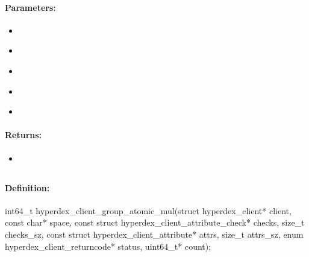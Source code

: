\paragraph{Parameters:}
\begin{itemize}[noitemsep]
\item {}\\

\item {}\\

\item {}\\

\item {}\\

\item {}\\

\end{itemize}

\paragraph{Returns:}
\begin{itemize}[noitemsep]
\item {}\\

\end{itemize}

\pagebreak
\subsection{}
\label{api:c:group_atomic_mul}


\paragraph{Definition:}
\begin{ccode}
int64_t hyperdex_client_group_atomic_mul(struct hyperdex_client* client,
        const char* space,
        const struct hyperdex_client_attribute_check* checks, size_t checks_sz,
        const struct hyperdex_client_attribute* attrs, size_t attrs_sz,
        enum hyperdex_client_returncode* status,
        uint64_t* count);
\end{ccode}

